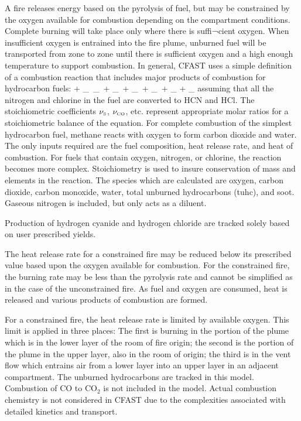 A fire releases energy based on the pyrolysis of fuel, but may be constrained by the oxygen available for combustion depending on the compartment conditions. Complete burning will take place only where there is suffi¬cient oxygen.  When insufficient oxygen is entrained into the fire plume, unburned fuel will be transported from zone to zone until there is sufficient oxygen and a high enough temperature to support combustion.  In general, CFAST uses a simple definition of a combustion reaction that includes major products of combustion for hydrocarbon fuels:
\be  {} +  \nu_\OTWO \,   \rightarrow  \nu_\COTWO \,  + \nu_\HTWOO \,  + \nu_\CO \,  +
     \nu_\So \,   + \nu_\HCl {} + \nu_\HCN {} \label{stoich} \ee
assuming that all the nitrogen and chlorine in the fuel are converted to HCN and HCl. The stoichiometric coefficients $\nu_{\tiny \hbox{S}}$, $\nu_{\tiny \hbox{CO}}$, etc. represent appropriate molar ratios for a stoichiometric balance of the equation. For complete combustion of the simplest hydrocarbon fuel, methane reacts with oxygen to form carbon dioxide and water. The only inputs required are the fuel composition, heat release rate, and heat of combustion. For fuels that contain oxygen, nitrogen, or chlorine, the reaction becomes more complex. Stoichiometry is used to insure conservation of mass and elements in the reaction. The species which are calculated are oxygen, carbon dioxide, carbon monoxide, water, total unburned hydrocarbons (tuhc), and soot. Gaseous nitrogen is included, but only acts as a diluent. 

Production of hydrogen cyanide and hydrogen chloride are tracked solely based on user prescribed yields.  

The heat release rate for a constrained fire may be reduced below its prescribed value based upon the oxygen available for combustion. For the constrained fire, the burning rate may be less than the pyrolysis rate and cannot be simplified as in the case of the unconstrained fire. As fuel and oxygen are consumed, heat is released and various products of combustion are formed.

For a constrained fire, the heat release rate is limited by available oxygen. This limit is applied in three places: The first is burning in the portion of the plume which is in the lower layer of the room of fire origin; the second is the portion of the plume in the upper layer, also in the room of origin; the third is in the vent flow which entrains air from a lower layer into an upper layer in an adjacent compartment. The unburned hydrocarbons are tracked in this model. Combustion of CO to CO$_2$ is not included in the model. Actual combustion chemistry is not considered in CFAST due to the complexities associated with detailed kinetics and transport.

